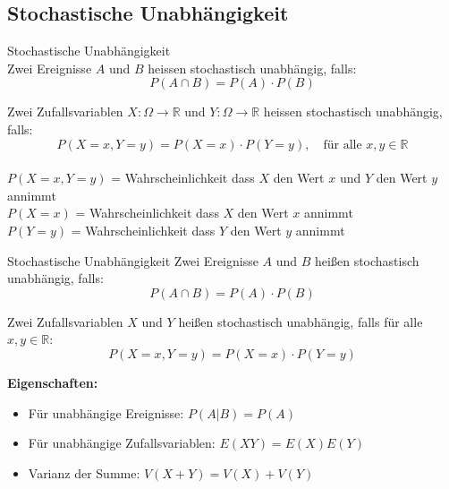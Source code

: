 \subsection{Stochastische Unabhängigkeit}
\begin{theorem}{Stochastische Unabhängigkeit}\\
Zwei Ereignisse $A$ und $B$ heissen stochastisch unabhängig, falls:
$$
P(A \cap B)=P(A) \cdot P(B)
$$

Zwei Zufallsvariablen $X: \Omega \rightarrow \mathbb{R}$ und $Y: \Omega \rightarrow \mathbb{R}$ heissen stochastisch unabhängig, falls:
$$
P(X=x, Y=y)=P(X=x) \cdot P(Y=y), \quad \text{für alle } x, y \in \mathbb{R}
$$
\\
$P(X=x, Y=y)$ = Wahrscheinlichkeit dass $X$ den Wert $x$ und $Y$ den Wert $y$ annimmt\\
$P(X=x)$ = Wahrscheinlichkeit dass $X$ den Wert $x$ annimmt\\
$P(Y=y)$ = Wahrscheinlichkeit dass $Y$ den Wert $y$ annimmt\\
\end{theorem}



\begin{definition}{Stochastische Unabhängigkeit}
Zwei Ereignisse $A$ und $B$ heißen stochastisch unabhängig, falls:
$$P(A \cap B) = P(A) \cdot P(B)$$

Zwei Zufallsvariablen $X$ und $Y$ heißen stochastisch unabhängig, falls für alle $x,y \in \mathbb{R}$:
$$P(X=x, Y=y) = P(X=x) \cdot P(Y=y)$$

\textbf{Eigenschaften:}
\begin{itemize}
    \item Für unabhängige Ereignisse: $P(A|B) = P(A)$
    \item Für unabhängige Zufallsvariablen: $E(XY) = E(X)E(Y)$
    \item Varianz der Summe: $V(X+Y) = V(X) + V(Y)$
\end{itemize}
\end{definition}

